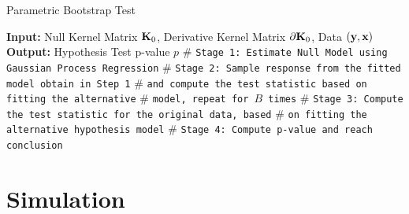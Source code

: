 \documentclass[11pt]{article}
\begin{document}
\begin{algorithm}
\caption{Parametric Bootstrap Test} 
\label{alg:cvek}
\begin{algorithmic}[1]
\newline
\textbf{Input:} Null Kernel Matrix ${\bf K}_0$, Derivative Kernel Matrix $\partial {\bf K}_0$, Data $({\bf y}, {\bf x})$\newline
\textbf{Output:} Hypothesis Test p-value $p$\newline
$\#$ \texttt{Stage 1: Estimate Null Model using Gaussian Process Regression}
\newline
$\#$ \texttt{Stage 2: Sample response from the fitted model obtain in Step 1}
\newline
$\#$ \texttt{and compute the test statistic based on fitting the alternative}
\newline
$\#$ \texttt{model, repeat for $B$ times}
\EndFor 
\newline
$\#$ \texttt{Stage 3: Compute the test statistic for the original data, based}
\newline
$\#$ \texttt{on fitting the alternative hypothesis model}
\newline
$\#$ \texttt{Stage 4: Compute p-value and reach conclusion}
\EndProcedure
\end{algorithmic}
\end{algorithm}

\section{{\bf Simulation}}
\end{document}
